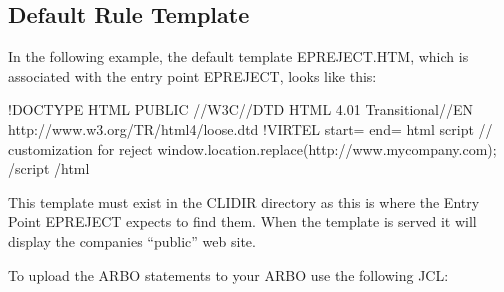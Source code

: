 \documentclass[letterpaper,10pt,english]{sphinxmanual}
\begin{document}
\ignorespaces 

\subsection{Default Rule Template}
\label{\detokenize{connectivity_guide:default-rule-template}}\label{\detokenize{connectivity_guide:index-190}}
\sphinxAtStartPar
In the following example, the default template EPREJECT.HTM, which is associated with the entry point EPREJECT, looks like this:\sphinxhyphen{}

\begin{sphinxVerbatim}[commandchars=\\\{\}]
\PYGZlt{}!DOCTYPE HTML PUBLIC \PYGZdq{}\PYGZhy{}//W3C//DTD HTML 4.01 Transitional//EN\PYGZdq{}
\PYGZdq{}http://www.w3.org/TR/html4/loose.dtd\PYGZdq{}\PYGZgt{}
\PYGZlt{}!\PYGZhy{}\PYGZhy{}VIRTEL start=\PYGZdq{}\PYGZob{}\PYGZob{}\PYGZob{}\PYGZdq{} end=\PYGZdq{}\PYGZcb{}\PYGZcb{}\PYGZcb{}\PYGZdq{} \PYGZhy{}\PYGZhy{}\PYGZgt{}
\PYGZlt{}html\PYGZgt{}
\PYGZlt{}script\PYGZgt{}
// customization for reject
window.location.replace(\PYGZdq{}http://www.mycompany.com\PYGZdq{});
\PYGZlt{}/script\PYGZgt{}
\PYGZlt{}/html\PYGZgt{}
\end{sphinxVerbatim}

\sphinxAtStartPar
This template must exist in the CLI\sphinxhyphen{}DIR directory as this is where the Entry Point EPREJECT expects to find them. When the template is served it will display the companies “public” web site.

\sphinxAtStartPar
To upload the ARBO statements to your ARBO use the following JCL:\sphinxhyphen{}
\end{document}
